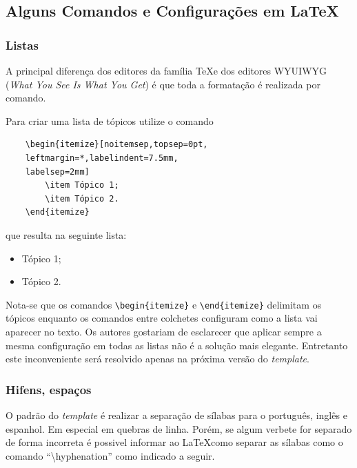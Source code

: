 \documentclass{RBClatex}
\begin{document}
\subsection{Alguns Comandos e Configurações em \LaTeX}

\subsubsection{Listas}

A principal diferença dos editores da família \TeX e dos editores WYUIWYG (\textit{What You See Is What You Get}) é que toda a formatação é realizada por comando. 

Para criar uma lista de tópicos utilize o comando 
\begin{verbatim}
	\begin{itemize}[noitemsep,topsep=0pt,
	leftmargin=*,labelindent=7.5mm,
	labelsep=2mm]
		\item Tópico 1;
		\item Tópico 2.
	\end{itemize}
\end{verbatim}
que resulta na seguinte lista:
\begin{itemize}[noitemsep,topsep=0pt,leftmargin=*,labelindent=7.5mm,labelsep=2mm]
	\item Tópico 1;
	\item Tópico 2.
\end{itemize}

Nota-se que os comandos \verb|\begin{itemize}| e \verb|\end{itemize}| delimitam os tópicos enquanto os comandos entre colchetes configuram como a lista vai aparecer no texto. Os autores gostariam de esclarecer que aplicar sempre a mesma configuração em todas as listas não é a solução mais elegante. Entretanto este inconveniente será resolvido apenas na próxima versão do \textit{template}.

\subsubsection{Hifens, espaços}

O padrão do \textit{template} é realizar a separação de sílabas para o português, inglês e espanhol. Em especial em quebras de linha. Porém, se algum verbete for separado de forma incorreta é possivel informar ao \LaTeX como separar as sílabas como o comando ``\textbackslash hyphenation'' como indicado a seguir.
\end{document}
